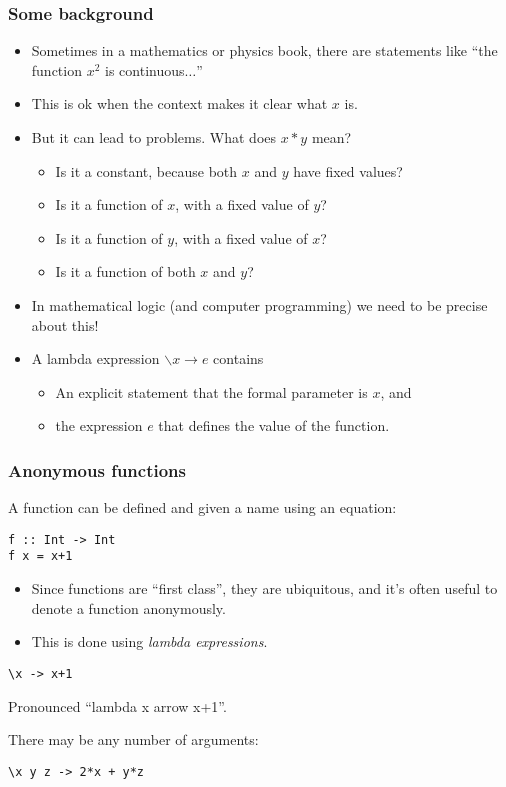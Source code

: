 \documentclass{beamer}
\begin{document}
\begin{frame}
\frametitle{Some background}

\begin{itemize}
\item Sometimes in a mathematics or physics book, there are
  statements like ``the function $x^2$ is continuous$\ldots$''
\item This is ok when the context makes it clear what $x$ is.
\item But it can lead to problems.  What does $x*y$ mean?
  \begin{itemize}
  \item Is it a constant, because both $x$ and $y$ have fixed
    values?
  \item Is it a function of $x$, with a fixed value of $y$?
  \item Is it a function of $y$, with a fixed value of $x$?
  \item Is it a function of both $x$ and $y$?
  \end{itemize}
\item In mathematical logic (and computer programming) we need to
  be precise about this!
\item A lambda expression $\backslash x \rightarrow e$ contains
  \begin{itemize}
  \item An explicit statement that the formal parameter is $x$, and
  \item the expression $e$ that defines the value of the function.
  \end{itemize}
\end{itemize}

\end{frame}

\begin{frame}[fragile]
\frametitle{Anonymous functions}

A function can be defined and given a name using an equation:

\begin{verbatim}
f :: Int -> Int
f x = x+1
\end{verbatim}

\begin{itemize}
\item Since functions are ``first class'', they are ubiquitous, and
  it's often useful to denote a function anonymously.
\item This is done using \emph{lambda expressions}.
\end{itemize}

\begin{verbatim}
\x -> x+1
\end{verbatim}

Pronounced ``lambda x arrow x+1''.

There may be any number of arguments:

\begin{verbatim}
\x y z -> 2*x + y*z
\end{verbatim}

\end{frame}
\end{document}
